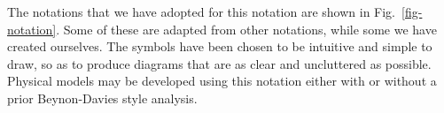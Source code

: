 \documentclass{llncs}
\begin{document}
The notations that we have adopted for this notation are shown in
Fig.~\ref{fig-notation}. Some of these are adapted from other notations,
while some we have created ourselves. The symbols have been chosen to be
intuitive and simple to draw, so as to produce diagrams that are as
clear and uncluttered as possible. Physical models may be developed
using this notation either with or without a prior Beynon-Davies style
analysis.

\begin{figure}
	\centering
	\hfill
	\hfill
		\\

\end{figure}
\end{document}
